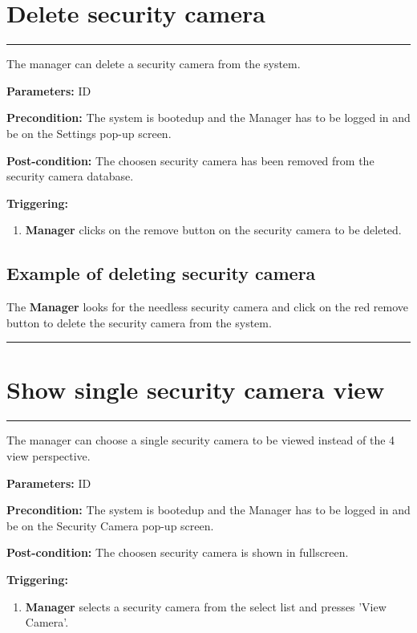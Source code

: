 \section{Delete security camera}
\hrule
\hfill
\vspace{0.5cm}
\label{operation:Delete security camera}

The manager can delete a security camera from the system.

\begin{description}

\item \textbf{Parameters:} ID
\item \textbf{Precondition:} The system is bootedup and the Manager has to be
logged in and be on the Settings pop-up screen.
\item \textbf{Post-condition:} The choosen security camera has been removed from the security camera database.
\item \textbf{Triggering:}
\begin{enumerate}

\item \textbf{Manager} clicks on the remove button on the security camera to be deleted.

\end{enumerate}
\end{description}

\subsection{Example of deleting security camera}
The \textbf{Manager} looks for the needless security camera and click on the red remove button to delete the security camera from the system.
\hfill
\vspace{0.5cm}
\hrule



\section{Show single security camera view}
\hrule
\hfill
\vspace{0.5cm}
\label{operation:Show single security camera view}

The manager can choose a single security camera to be viewed instead of the 4 view perspective.

\begin{description}

\item \textbf{Parameters:} ID
\item \textbf{Precondition:} The system is bootedup and the Manager has to be
logged in and be on the Security Camera pop-up screen.
\item \textbf{Post-condition:} The choosen security camera is shown in fullscreen.
\item \textbf{Triggering:}
\begin{enumerate}

\item \textbf{Manager} selects a security camera from the select list and presses 'View Camera'.

\end{enumerate}
\end{description}

